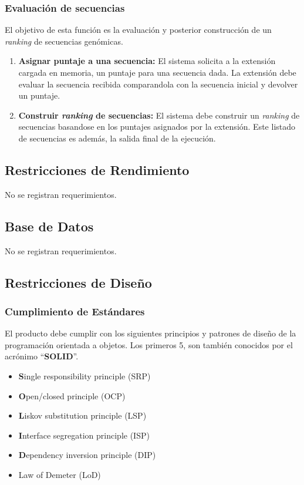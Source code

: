 \documentclass[10pt,a4paper]{article}
\begin{document}
  \subsubsection{Evaluaci\'on de secuencias}
  El objetivo de esta funci\'on es la evaluaci\'on y posterior construcci\'on de un \textit{ranking} de secuencias gen\'omicas.
  \begin{enumerate}    
    \item \textbf{Asignar puntaje a una secuencia:}
    El sistema solicita a la extensi\'on cargada en memoria, un puntaje para una secuencia dada. La extensi\'on debe evaluar la secuencia recibida comparandola con la secuencia inicial y devolver un puntaje.
    
    \item \textbf{Construir \textit{ranking} de secuencias:}
    El sistema debe construir un \textit{ranking} de secuencias basandose en los puntajes asignados por la extensi\'on. Este listado de secuencias es adem\'as, la salida final de la ejecuci\'on.
  \end{enumerate}

  \subsection{Restricciones de Rendimiento}
  No se registran requerimientos.

  \subsection{Base de Datos}
  No se registran requerimientos.

  \subsection{Restricciones de Dise\~no}
    \subsubsection{Cumplimiento de Est\'andares}
    El producto debe cumplir con los siguientes principios y patrones de dise\~no de la programaci\'on orientada a objetos. Los primeros 5, son tambi\'en conocidos por el acr\'onimo ``\textbf{SOLID}''.
    \begin{itemize}
      \item \textbf{S}ingle responsibility principle (SRP)
      \item \textbf{O}pen/closed principle (OCP)
      \item \textbf{L}iskov substitution principle (LSP)
      \item \textbf{I}nterface segregation principle (ISP)
      \item \textbf{D}ependency inversion principle (DIP)   
      \item Law of Demeter (LoD)
    \end{itemize}
\end{document}
